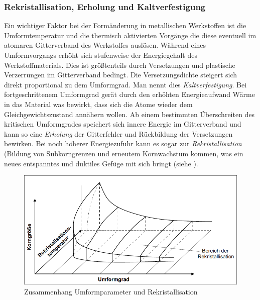 \documentclass[12pt,a4paper,parskip,twoside,BCOR5mm,headsepline]{scrartcl}
\begin{document}
\begin{description*}
{\subsubsection{Rekristallisation, Erholung und Kaltverfestigung}
Ein wichtiger Faktor bei der Formänderung in metallischen Werkstoffen ist die Umformtemperatur und die thermisch aktivierten Vorgänge die diese eventuell im atomaren Gitterverband des Werkstoffes auslösen. Während eines Umformvorgangs erhöht sich stufenweise der Energiegehalt des Werkstoffmaterials. Dies ist größtenteils durch Versetzungen und plastische Verzerrungen im Gitterverband bedingt. Die Versetzungsdichte steigert sich direkt proportional zu dem Umformgrad. Man nennt dies \emph{Kaltverfestigung}. Bei fortgeschrittenem Umformgrad gerät durch den erhöhten Energieaufwand Wärme in das Material was bewirkt, dass sich die Atome wieder dem Gleichgewichtszustand annähern wollen. Ab einem bestimmten Überschreiten des kritischen Umformgrades speichert sich innere Energie im Gitterverband und kann so eine \emph{Erholung} der Gitterfehler und Rückbildung der Versetzungen bewirken. Bei noch höherer Energiezufuhr kann es sogar zur \emph{Rekristallisation} (Bildung von Subkorngrenzen und erneutem Kornwachstum kommen, was ein neues entspanntes und duktiles Gefüge mit sich bringt (siehe ).                   
 \autocite[11-13]{fu}
\begin{figure}
\centering
\includegraphics[width=.8\textwidth]{rekristall}
\caption[Zusammenhang Umformparameter und Rekristallisation]{Zusammenhang Umformparameter und Rekristallisation\autocite[13]{fu}}
\label{fig:rekristall}
\end{figure}






}
\end{description*}
\end{document}
